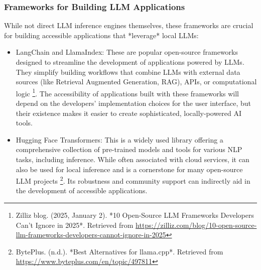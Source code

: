 \subsubsection{Frameworks for Building LLM Applications}
While not direct LLM inference engines themselves, these frameworks are crucial for building accessible applications that *leverage* local LLMs:
\begin{itemize}
    \item LangChain and LlamaIndex: These are popular open-source frameworks designed to streamline the development of applications powered by LLMs. They simplify building workflows that combine LLMs with external data sources (like Retrieval Augmented Generation, RAG), APIs, or computational logic \footnote{Zilliz blog. (2025, January 2). *10 Open-Source LLM Frameworks Developers Can't Ignore in 2025*. Retrieved from \url{https://zilliz.com/blog/10-open-source-llm-frameworks-developers-cannot-ignore-in-2025}}. The accessibility of applications built with these frameworks will depend on the developers' implementation choices for the user interface, but their existence makes it easier to create sophisticated, locally-powered AI tools.
    \item Hugging Face Transformers: This is a widely used library offering a comprehensive collection of pre-trained models and tools for various NLP tasks, including inference. While often associated with cloud services, it can also be used for local inference and is a cornerstone for many open-source LLM projects \footnote{BytePlus. (n.d.). *Best Alternatives for llama.cpp*. Retrieved from \url{https://www.byteplus.com/en/topic/497811}}. Its robustness and community support can indirectly aid in the development of accessible applications.
\end{itemize}

